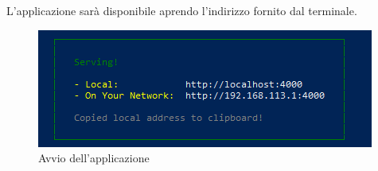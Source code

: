 L'applicazione sarà disponibile aprendo l'indirizzo fornito dal terminale.

\begin{figure}[H]
		\includegraphics[scale=1]{Images/install.png}
		\centering
		\caption{Avvio dell'applicazione}
\end{figure}
  			